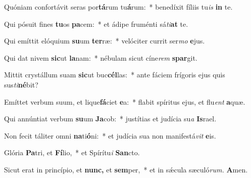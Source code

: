 \item Quóniam confortávit seras por\textbf{tá}rum tu\textbf{á}rum:~* benedíxit fíliis tu\hspace*{0.02em}\textit{is} \textbf{in} te.
\item Qui pósuit fines \textbf{tu}os \textbf{pa}cem:~* et ádipe fruménti sá\hspace*{0.02em}\textit{ti}\textbf{at} te.
\item Qui emíttit elóquium \textbf{su}um \textbf{ter}ræ:~* velóciter currit ser\textit{mo} \textbf{e}jus.
\item Qui dat nivem \textbf{sic}ut \textbf{la}nam:~* nébulam sicut cíne\hspace*{0.02em}\textit{rem} \textbf{spar}git.
\item Mittit crystállum suam \textbf{sic}ut buc\textbf{cél}las:~* ante fáciem frígoris ejus quis sus\hspace*{0.02em}\textit{ti}\textbf{né}bit?
\item Emíttet verbum suum, et lique\textbf{fá}ciet \textbf{e}a:~* flabit spíritus ejus, et flu\hspace*{0.02em}\textit{ent} \textbf{a}quæ.
\item Qui annúntiat verbum \textbf{su}um \textbf{Ja}cob:~* justítias et judícia su\hspace*{0.02em}\textit{a} \textbf{Is}rael.
\item Non fecit táliter omni \textbf{na}ti\textbf{ó}ni:~* et judícia sua non manife\-stá\textit{vit} \textbf{e}is.
\item Glória \textbf{Pa}tri, et \textbf{Fí}lio,~* et Spírítu\textit{i} \textbf{San}cto.
\item Sicut erat in princípio, et \textbf{nunc,} et \textbf{sem}per,~* et in sǽcula sæculó\textit{rum.} \textbf{A}men.